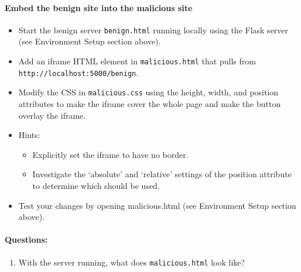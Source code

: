 \paragraph{Embed the benign site into the malicious site}
\begin{itemize}
    \item Start the benign server \texttt{benign.html} running
    locally using the Flask server (see Environment Setup section 
    above).
    \item Add an iframe HTML element in \texttt{malicious.html} that 
    pulls from \texttt{http://localhost:5000/benign}. 
    \item Modify the CSS in \texttt{malicious.css} using the height,
    width, and position attributes to make the iframe cover the whole 
    page and make the button overlay the iframe.
    
    \item Hints:
    \begin{itemize}
       \item Explicitly set the iframe to have no border.
       \item Investigate the `absolute' and `relative' settings of the 
       position attribute to determine which should be used.
    \end{itemize} 

    \item Test your changes by opening malicious.html (see Environment
    Setup section above).  

\end{itemize} 



\paragraph{Questions:}
\begin{enumerate}
    \item With the server running, what does \texttt{malicious.html} 
    look like?
\end{enumerate}

